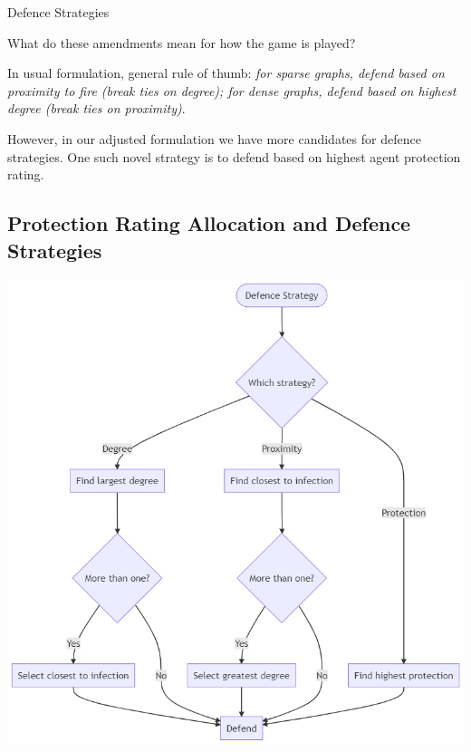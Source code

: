 \documentclass[unknownkeysallowed]{beamer}
\begin{document}
\begin{frame}{Defence Strategies}

What do these amendments mean for how the game is played?\pause

\vspace{5pt}

In usual formulation, general rule of thumb: {\it for sparse graphs, defend based on proximity to fire (break ties on degree); for dense graphs, defend based on highest degree (break ties on proximity)}. \pause

\vspace{5pt}

However, in our adjusted formulation we have more candidates for defence strategies. One such novel strategy is to defend based on highest agent protection rating.

\end{frame}

\subsection{Protection Rating Allocation and Defence Strategies}

\begin{frame}
\centering\includegraphics[height=.9\textheight]{assets/flowcharts/defence}
\end{frame}
\end{document}
